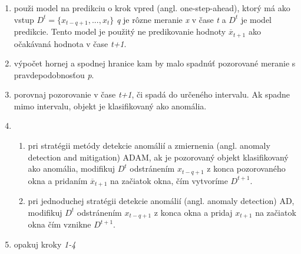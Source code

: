 \begin{enumerate}
	\item použi model na predikciu o krok vpred (angl. one-step-ahead), ktorý má ako vstup $\displaystyle D^t = \{x_{t-q+1}, ..., x_t\}$ \textit{q} je rôzne meranie \textit{x} v čase \textit{t} a $\displaystyle D^t$ je model predikcie. Tento model je použitý ne predikovanie hodnoty $\displaystyle \overline{x}_{t+1}$ ako očakávaná hodnota v čase \textit{t+1}.
	\item výpočet hornej a spodnej hranice kam by malo spadnúť pozorované meranie s pravdepodobnosťou \textit{p}.
	\item porovnaj pozorovanie v čase \textit{t+1}, či spadá do určeného intervalu. Ak spadne mimo intervalu, objekt je klasifikovaný ako anomália.
	\item 
		\begin{enumerate}
			\item pri stratégii metódy detekcie anomálií a zmiernenia (angl. anomaly detection and mitigation) ADAM, ak je pozorovaný objekt klasifikovaný ako anomália, modifikuj $\displaystyle D^t$ odstránením $\displaystyle x_{t-q+1}$ z konca pozorovaného okna a pridaním $\displaystyle \overline{x}_{t+1}$ na začiatok okna, čím vytvoríme $\displaystyle D^{t+1}$.
			\item pri jednoduchej stratégii detekcie anomálií (angl. anomaly detection) AD, modifikuj $\displaystyle D^t$  odstránením $\displaystyle x_{t-q+1}$ z konca okna a pridaj $\displaystyle x_{t+1}$ na začiatok okna čím vznikne $\displaystyle D^{t+1}$.
		\end{enumerate}
	\item opakuj kroky \textit{1-4}
\end{enumerate}
